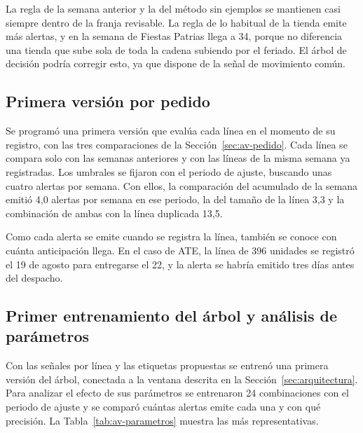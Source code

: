 La regla de la semana anterior y la del método sin ejemplos se mantienen casi siempre dentro de la franja revisable. La regla de lo habitual de la tienda emite más alertas, y en la semana de Fiestas Patrias llega a 34, porque no diferencia una tienda que sube sola de toda la cadena subiendo por el feriado. El árbol de decisión podría corregir esto, ya que dispone de la señal de movimiento común.

\subsection{Primera versión por pedido}
\label{sec:av-por-pedido}

Se programó una primera versión que evalúa cada línea en el momento de su registro, con las tres comparaciones de la Sección~\ref{sec:av-pedido}. Cada línea se compara solo con las semanas anteriores y con las líneas de la misma semana ya registradas. Los umbrales se fijaron con el periodo de ajuste, buscando unas cuatro alertas por semana. Con ellos, la comparación del acumulado de la semana emitió 4,0 alertas por semana en ese periodo, la del tamaño de la línea 3,3 y la combinación de ambas con la línea duplicada 13,5.

Como cada alerta se emite cuando se registra la línea, también se conoce con cuánta anticipación llega. En el caso de ATE, la línea de 396 unidades se registró el 19 de agosto para entregarse el 22, y la alerta se habría emitido tres días antes del despacho.

\subsection{Primer entrenamiento del árbol y análisis de parámetros}
\label{sec:av-arbol}

Con las señales por línea y las etiquetas propuestas se entrenó una primera versión del árbol, conectada a la ventana descrita en la Sección~\ref{sec:arquitectura}. Para analizar el efecto de sus parámetros se entrenaron 24 combinaciones con el periodo de ajuste y se comparó cuántas alertas emite cada una y con qué precisión. La Tabla~\ref{tab:av-parametros} muestra las más representativas.

